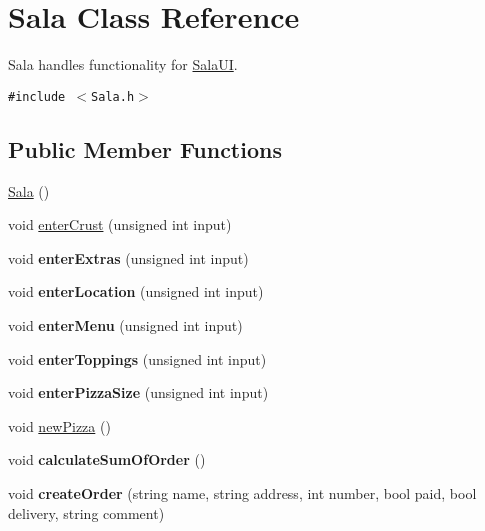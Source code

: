 \hypertarget{class_sala}{
\section{Sala Class Reference}
\label{class_sala}
}
Sala handles functionality for \hyperlink{class_sala_u_i}{Sala\-UI}.  


{\tt \#include $<$Sala.h$>$}

\subsection*{Public Member Functions}
\begin{CompactItemize}
\item 
\hyperlink{class_sala_da283dd136f3f0c2703d0356f49c1e6e}{Sala} ()
\item 
void \hyperlink{class_sala_ae3b8375ca0ab5b62e84f86582b8cec3}{enter\-Crust} (unsigned int input)
\item 
\hypertarget{class_sala_f4637151f3f934bdf727685020e956e2}{
void {\bf enter\-Extras} (unsigned int input)}
\label{class_sala_f4637151f3f934bdf727685020e956e2}

\item 
\hypertarget{class_sala_d5b546b927926e2eed280fcdc087135e}{
void {\bf enter\-Location} (unsigned int input)}
\label{class_sala_d5b546b927926e2eed280fcdc087135e}

\item 
\hypertarget{class_sala_1015bfdd699f9dc90a677a87def0b37b}{
void {\bf enter\-Menu} (unsigned int input)}
\label{class_sala_1015bfdd699f9dc90a677a87def0b37b}

\item 
\hypertarget{class_sala_34479ade70e563ba9c7eb9b66df2270e}{
void {\bf enter\-Toppings} (unsigned int input)}
\label{class_sala_34479ade70e563ba9c7eb9b66df2270e}

\item 
\hypertarget{class_sala_caeeb8aada209ebb8bde4749b2ececdc}{
void {\bf enter\-Pizza\-Size} (unsigned int input)}
\label{class_sala_caeeb8aada209ebb8bde4749b2ececdc}

\item 
void \hyperlink{class_sala_eadce54d849ca6634b7fdd389bd8f192}{new\-Pizza} ()
\item 
\hypertarget{class_sala_24b9bb5302a251b41fed3df1fb7ce8ad}{
void {\bf calculate\-Sum\-Of\-Order} ()}
\label{class_sala_24b9bb5302a251b41fed3df1fb7ce8ad}

\item 
\hypertarget{class_sala_554463c0b82fb266c21e23e040bf1ac0}{
void {\bf create\-Order} (string name, string address, int number, bool paid, bool delivery, string comment)}
\label{class_sala_554463c0b82fb266c21e23e040bf1ac0}


\end{CompactItemize}
